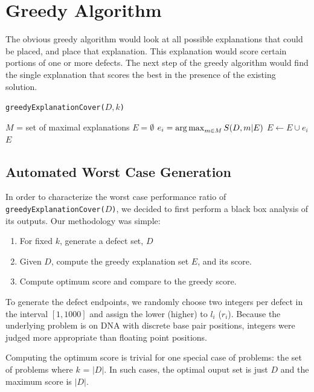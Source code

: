 \section{Greedy Algorithm} \label{sec:greedy}

The obvious greedy algorithm would look at all possible explanations that could be placed, and place that explanation. This explanation would score certain portions of one or more defects.  The next step of the greedy algorithm would find the single explanation that scores the best in the presence of the existing solution.  

\begin{algorithm}
  \caption{ \texttt{greedyExplanationCover($D,k$)} }
  \label{alg:greedy}
  \begin{algorithmic}
    \State $M$ = set of maximal explanations
    \State $E = \emptyset$
    \State $e_i = \operatorname*{arg\,max}_{m\in M} S(D,m|E)$
    \State $E \leftarrow E \cup e_i$
    \EndWhile
    \State \Return $E$
  \end{algorithmic}
\end{algorithm}

\subsection{Automated Worst Case Generation}

In order to characterize the worst case performance ratio of \texttt{greedyExplanationCover($D$)}, we decided to first perform a black box analysis of its outputs.  Our methodology was simple: 

\begin{enumerate}
\item For fixed $k$, generate a defect set, $D$
\item Given $D$, compute the greedy explanation set $E$, and its score.
\item Compute optimum score and compare to the greedy score.
\end{enumerate}

To generate the defect endpoints, we randomly choose two integers per defect in the interval $[1,1000]$ and assign the lower (higher) to $l_i$ ($r_i$).  Because the underlying problem is on DNA with discrete base pair positions, integers were judged more appropriate than floating point positions.

Computing the optimum score is trivial for one special case of problems: the set of problems where $k$ = $|D|$.  In such cases, the optimal ouput set is just $D$ and the maximum score is $|D|$.  


